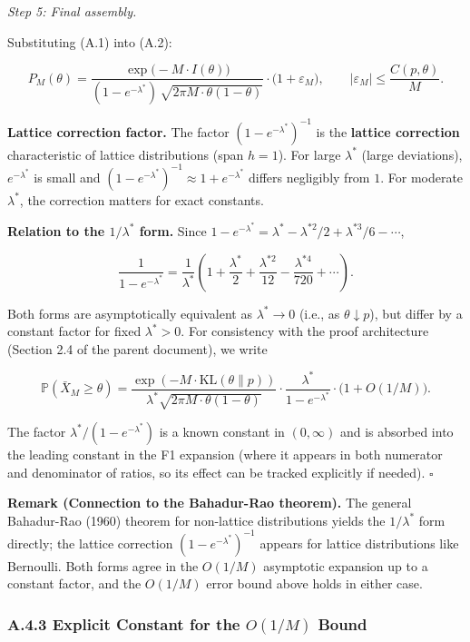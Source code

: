 \documentclass[
  12pt,
]{article}
\begin{document}
\emph{Step 5: Final assembly.}

Substituting (A.1) into (A.2):

\[
P_M(\theta) = \frac{\exp\!\big(-M\cdot I(\theta)\big)}
{(1-e^{-\lambda^*})\,\sqrt{2\pi M\cdot\theta(1-\theta)}}
\cdot \big(1 + \varepsilon_M\big), \qquad |\varepsilon_M| \leq \frac{C(p,\theta)}{M}.
\]

\textbf{Lattice correction factor.} The factor
\((1-e^{-\lambda^*})^{-1}\) is the \textbf{lattice correction}
characteristic of lattice distributions (span \(h=1\)). For large
\(\lambda^*\) (large deviations), \(e^{-\lambda^*}\) is small and
\((1-e^{-\lambda^*})^{-1} \approx 1 + e^{-\lambda^*}\) differs
negligibly from \(1\). For moderate \(\lambda^*\), the correction
matters for exact constants.

\textbf{Relation to the \(1/\lambda^*\) form.} Since
\(1-e^{-\lambda^*} = \lambda^* - \lambda^{*2}/2 + \lambda^{*3}/6 - \cdots\),

\[\frac{1}{1-e^{-\lambda^*}} = \frac{1}{\lambda^*}\left(1 + \frac{\lambda^*}{2} + \frac{\lambda^{*2}}{12} - \frac{\lambda^{*4}}{720} + \cdots\right).\]

Both forms are asymptotically equivalent as \(\lambda^* \to 0\) (i.e.,
as \(\theta \downarrow p\)), but differ by a constant factor for fixed
\(\lambda^* > 0\). For consistency with the proof architecture (Section
2.4 of the parent document), we write

\[
\boxed{\;
\mathbb{P}(\bar{X}_M \geq \theta)
= \frac{\exp(-M \cdot \text{KL}(\theta \| p))}
{\lambda^* \sqrt{2\pi M \cdot \theta(1-\theta)}}
\cdot \frac{\lambda^*}{1-e^{-\lambda^*}}
\cdot \big(1 + O(1/M)\big).\;}
\]

The factor \(\lambda^*/(1-e^{-\lambda^*})\) is a known constant in
\((0, \infty)\) and is absorbed into the leading constant in the F1
expansion (where it appears in both numerator and denominator of ratios,
so its effect can be tracked explicitly if needed). \(\square\)

\textbf{Remark (Connection to the Bahadur-Rao theorem).} The general
Bahadur-Rao (1960) theorem for non-lattice distributions yields the
\(1/\lambda^*\) form directly; the lattice correction
\((1-e^{-\lambda^*})^{-1}\) appears for lattice distributions like
Bernoulli. Both forms agree in the \(O(1/M)\) asymptotic expansion up to
a constant factor, and the \(O(1/M)\) error bound above holds in either
case.

\subsubsection{\texorpdfstring{A.4.3 Explicit Constant for the
\(O(1/M)\)
Bound}{A.4.3 Explicit Constant for the O(1/M) Bound}}\label{a.4.3-explicit-constant-for-the-o1m-bound}
\end{document}

